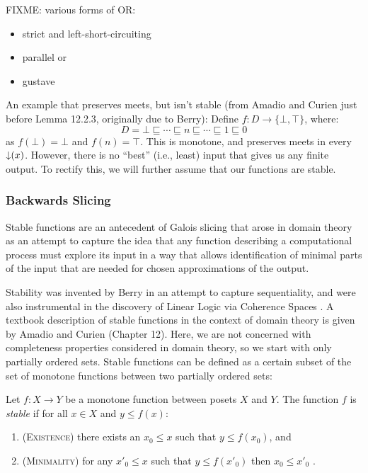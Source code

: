 \begin{example}
  FIXME: various forms of OR:
  \begin{itemize}
  \item strict and left-short-circuiting
  \item parallel or
  \item gustave
  \end{itemize}
\end{example}

\begin{example}
  An example that preserves meets, but isn't stable (from Amadio and
  Curien just before Lemma 12.2.3, originally due to Berry): Define
  $f : D \to \{\bot, \top\}$, where:
  \begin{displaymath}
    D = \bot \sqsubseteq \cdots \sqsubseteq n \sqsubseteq \cdots \sqsubseteq 1 \sqsubseteq 0
  \end{displaymath}
  as $f(\bot) = \bot$ and $f(n) = \top$. This is monotone, and
  preserves meets in every $\mathop{\downarrow}(x)$. However, there is no
  ``best'' (i.e., least) input that gives us any finite output. To
  rectify this, we will further assume that our functions are stable.
\end{example}

\subsubsection{Backwards Slicing}

Stable functions are an antecedent of Galois slicing that arose in
domain theory as an attempt to capture the idea that any function
describing a computational process must explore its input in a way
that allows identification of minimal parts of the input that are
needed for chosen approximations of the output.

Stability was invented by Berry \cite{berry86} in an attempt to capture
sequentiality, and were also instrumental in the discovery of Linear
Logic via Coherence Spaces \cite{girard}. A textbook description of
stable functions in the context of domain theory is given by Amadio
and Curien \cite{amadio-curien} (Chapter 12). Here, we are not
concerned with completeness properties considered in domain theory, so
we start with only partially ordered sets. Stable functions can be
defined as a certain subset of the set of monotone functions between
two partially ordered sets:

\begin{definition}
  Let $f : X \to Y$ be a monotone function between posets $X$ and
  $Y$. The function $f$ is \emph{stable} if for all $x \in X$ and
  $y \leq f(x)$:
  \begin{enumerate}
  \item (\textsc{Existence}) there exists an $x_0 \leq x$ such that $y \leq f(x_0)$, and
  \item (\textsc{Minimality}) for any $x'_0 \leq x$ such that $y \leq f(x'_0)$ then
    $x_0 \leq x'_0$ .
  \end{enumerate}
\end{definition}

